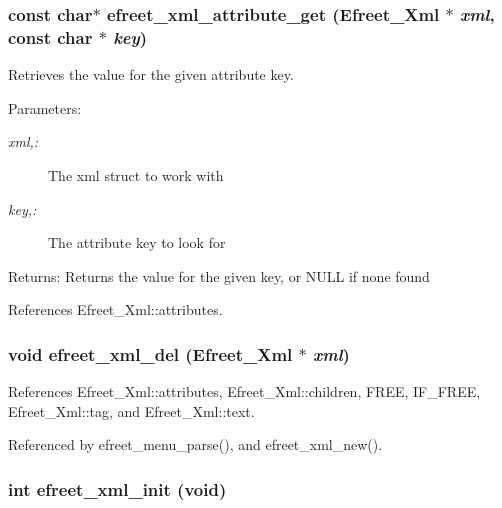 \subsubsection[efreet\_\-xml\_\-attribute\_\-get]{\setlength{\rightskip}{0pt plus 5cm}const char$\ast$ efreet\_\-xml\_\-attribute\_\-get ({\bf Efreet\_\-Xml} $\ast$ {\em xml}, \/  const char $\ast$ {\em key})}\label{efreet__xml_8c_bb8a77ca97f883d4b60c14e47099272e}


Retrieves the value for the given attribute key. 

\begin{Desc}
\item[Parameters:]
\begin{description}
\item[{\em xml,:}]The xml struct to work with \item[{\em key,:}]The attribute key to look for \end{description}
\end{Desc}
\begin{Desc}
\item[Returns:]Returns the value for the given key, or NULL if none found \end{Desc}


References Efreet\_\-Xml::attributes.
\subsubsection[efreet\_\-xml\_\-del]{\setlength{\rightskip}{0pt plus 5cm}void efreet\_\-xml\_\-del ({\bf Efreet\_\-Xml} $\ast$ {\em xml})}\label{efreet__xml_8c_43503b3ca04624a604f71e023dbc1fb8}




References Efreet\_\-Xml::attributes, Efreet\_\-Xml::children, FREE, IF\_\-FREE, Efreet\_\-Xml::tag, and Efreet\_\-Xml::text.

Referenced by efreet\_\-menu\_\-parse(), and efreet\_\-xml\_\-new().
\subsubsection[efreet\_\-xml\_\-init]{\setlength{\rightskip}{0pt plus 5cm}int efreet\_\-xml\_\-init (void)}\label{efreet__xml_8c_7a2ad4fd7dfefb664c99f198d880d606}




